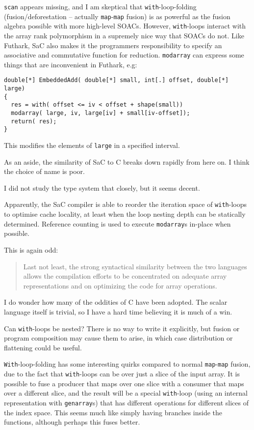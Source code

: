 \documentclass[a4paper, oneside, final]{memoir}
\begin{document}
\texttt{scan} appears missing, and I am skeptical that
\texttt{with}-loop-folding (fusion/deforestation -- actually
\texttt{map}-\texttt{map} fusion) is as powerful as the fusion algebra
possible with more high-level SOACs.  However, \texttt{with}-loops
interact with the array rank polymorphism in a supremely nice way that
SOACs do not.  Like Futhark, SaC also makes it the programmers
responsibility to specify an associative and commutative function for
reduction.  \texttt{modarray} can express some things that are
inconvenient in Futhark, e.g:

\begin{verbatim}
double[*] EmbeddedAdd( double[*] small, int[.] offset, double[*] large)
{
  res = with( offset <= iv < offset + shape(small))
  modarray( large, iv, large[iv] + small[iv-offset]);
  return( res);
}
\end{verbatim}

This modifies the elements of \texttt{large} in a specified interval.

As an aside, the similarity of SaC to C breaks down rapidly from here
on.  I think the choice of name is poor.

I did not study the type system that closely, but it seems decent.

Apparently, the SaC compiler is able to reorder the iteration space of
\texttt{with}-loops to optimise cache locality, at least when the loop
nesting depth can be statically determined.  Reference counting is
used to execute \texttt{modarray}s in-place when possible.

This is again odd:

\begin{quote}
  Last not least, the strong syntactical similarity between the two
  languages allows the compilation efforts to be concentrated on
  adequate array representations and on optimizing the code for array
  operations.
\end{quote}

I do wonder how many of the oddities of C have been adopted.  The
scalar language itself is trivial, so I have a hard time believing it
is much of a win.

Can \texttt{with}-loops be nested?  There is no way to write it
explicitly, but fusion or program composition may cause them to arise,
in which case distribution or flattening could be useful.

\texttt{With}-loop-folding has some interesting quirks compared to
normal \texttt{map}-\texttt{map} fusion, due to the fact that
\texttt{with}-loops can be over just a slice of the input array.  It
is possible to fuse a producer that maps over one slice with a
consumer that maps over a different slice, and the result will be a
special \texttt{with}-loop (using an internal representation with
\texttt{genarray}s) that has different operations for different slices
of the index space.  This seems much like simply having branches
inside the functions, although perhaps this fuses better.
\end{document}

